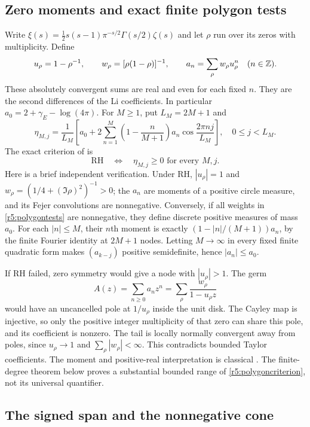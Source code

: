 \documentclass[11pt,a4paper]{article}
\theoremstyle{definition}\newtheorem{definition}[theorem]{Definition}
\theoremstyle{remark}\newtheorem{remark}[theorem]{Remark}
\numberwithin{equation}{section}
\begin{document}
\subsection{Zero moments and exact finite polygon tests}

Write $\xi(s)=\frac12s(s-1)\pi^{-s/2}\Gamma(s/2)\zeta(s)$ and
let $\rho$ run over its zeros with multiplicity. Define
\[
 u_\rho=1-\rho^{-1},\qquad
 w_\rho=[\rho(1-\rho)]^{-1},\qquad
 a_n=\sum_\rho w_\rho u_\rho^n\quad(n\in\mathbb Z).
\]
These absolutely convergent sums are real and even for each fixed
$n$. They are the second differences of the Li coefficients.
In particular $a_0=2+\gamma_E-\log(4\pi)$.
For $M\ge1$, put $L_M=2M+1$ and
\begin{equation}\label{r5:polygontests}
 \eta_{M,j}=\frac1{L_M}
 \left[a_0+2\sum_{n=1}^M
  \left(1-\frac n{M+1}\right)a_n
       \cos\frac{2\pi nj}{L_M}\right],
 \quad 0\le j<L_M.
\end{equation}
The exact criterion of \cite{TransferZeta} is
\begin{equation}\label{r5:polygoncriterion}
 \mathrm{RH}\quad\Longleftrightarrow\quad
 \eta_{M,j}\ge0\text{ for every }M,j.
\end{equation}
Here is a brief independent verification. Under RH, $|u_\rho|=1$
and $w_\rho=(1/4+(\Im\rho)^2)^{-1}>0$; the $a_n$ are moments of
a positive circle measure, and its Fejer convolutions are
nonnegative. Conversely, if all weights in
\eqref{r5:polygontests} are nonnegative, they define discrete
positive measures of mass $a_0$. For each $|n|\le M$, their
$n$th moment is exactly $(1-|n|/(M+1))a_n$, by the finite
Fourier identity at $2M+1$ nodes. Letting $M\to\infty$ in every
fixed finite quadratic form makes $(a_{k-j})$ positive
semidefinite, hence $|a_n|\le a_0$.

If RH failed, zero symmetry would give a node with $|u_\rho|>1$.
The germ
\[
 A(z)=\sum_{n\ge0}a_nz^n
     =\sum_\rho\frac{w_\rho}{1-u_\rho z}
\]
would have an uncancelled pole at $1/u_\rho$ inside the unit
disk. The Cayley map is injective, so only the positive integer
multiplicity of that zero can share this pole, and its coefficient
is nonzero. The tail is locally normally convergent away from
poles, since $u_\rho\to1$ and $\sum_\rho|w_\rho|<\infty$.
This contradicts bounded Taylor coefficients. The moment and
positive-real interpretation is classical \cite{Lagarias}.
The finite-degree theorem below proves a substantial bounded range
of \eqref{r5:polygoncriterion}, not its universal quantifier.

\subsection{The signed span and the nonnegative cone}
\end{document}
